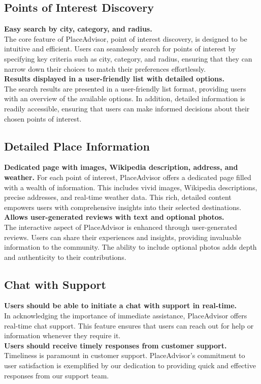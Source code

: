 \documentclass[../main.tex]{subfiles}
\begin{document}
\subsection{Points of Interest Discovery}
\textbf{Easy search by city, category, and radius.}\\
The core feature of PlaceAdvisor, point of interest discovery, is designed to be intuitive and efficient. Users can seamlessly search for points of interest by specifying key criteria such as city, category, and radius, ensuring that they can narrow down their choices to match their preferences effortlessly.\\
\textbf{Results displayed in a user-friendly list with detailed options.}\\
The search results are presented in a user-friendly list format, providing users with an overview of the available options. In addition, detailed information is readily accessible, ensuring that users can make informed decisions about their chosen points of interest.

\subsection{Detailed Place Information}
\textbf{Dedicated page with images, Wikipedia description, address, and weather.}
For each point of interest, PlaceAdvisor offers a dedicated page filled with a wealth of information. This includes vivid images, Wikipedia descriptions, precise addresses, and real-time weather data. This rich, detailed content empowers users with comprehensive insights into their selected destinations.\\
\textbf{Allows user-generated reviews with text and optional photos.}\\
The interactive aspect of PlaceAdvisor is enhanced through user-generated reviews. Users can share their experiences and insights, providing invaluable information to the community. The ability to include optional photos adds depth and authenticity to their contributions.

\subsection{Chat with Support}
\textbf{Users should be able to initiate a chat with support in real-time.}\\
In acknowledging the importance of immediate assistance, PlaceAdvisor offers real-time chat support. This feature ensures that users can reach out for help or information whenever they require it.\\
\textbf{Users should receive timely responses from customer support.}\\
Timeliness is paramount in customer support. PlaceAdvisor's commitment to user satisfaction is exemplified by our dedication to providing quick and effective responses from our support team.
\end{document}
